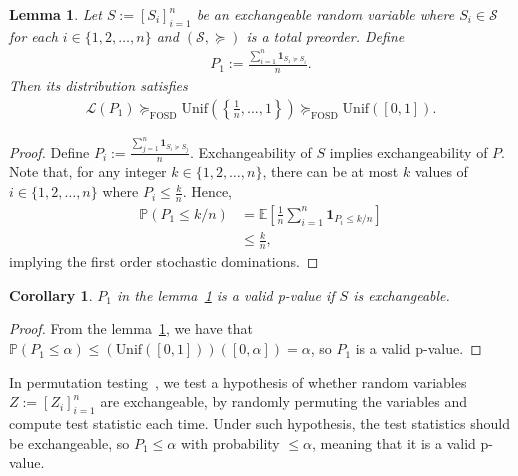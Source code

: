 \documentclass{article}
\newcommand{\expect}[1]{\mathbb{E}\left[ #1 \right]}
\newcommand{\prob}[1]{\mathbb{P}\left( #1 \right)}
\newcommand{\oo}[1]{\left( #1 \right)}
\newcommand{\cc}[1]{\left[ #1 \right]}
\newtheorem{lemma}{Lemma}
\newtheorem{corollary}{Corollary}
\begin{document}
    \begin{lemma}
    \label{lemma:exchangepvalue}
        Let $S:=\cc{S_i}_{i=1}^n$ be an exchangeable random variable where $S_i \in \mathcal{S}$ for each $i \in \{1,2,\dots, n\}$ and $\oo{\mathcal{S}, \succcurlyeq}$ is a total preorder. Define
        \begin{align*}
            P_1 := \frac{\sum_{i=1}^n \mathbf{1}_{S_1 \succcurlyeq S_i}}{n}.
        \end{align*}
        Then its distribution satisfies
        \begin{align*}
            \mathcal{L}(P_1)
            \succcurlyeq_{\mathrm{FOSD}}
            \mathrm{Unif}\!\left(\left\{\frac{1}{n},\ldots,1\right\}\right)
            \succcurlyeq_{\mathrm{FOSD}}
            \mathrm{Unif}([0,1]).
        \end{align*}
    \end{lemma}
    \begin{proof}
        Define $P_i:= \frac{\sum_{j=1}^n \mathbf{1}_{S_i \succcurlyeq S_j}}{n}$. Exchangeability of $S$ implies exchangeability of $P$. Note that, for any integer $k \in \{1,2,\dots, n\}$, there can be at most $k$ values of $i \in \{1,2,\dots, n\}$ where $P_i \le \frac{k}{n}$. Hence,
        \begin{align*}
            \prob{P_1 \le k/n}
            &= \expect{\frac{1}{n}
            \sum_{i=1}^n \mathbf{1}_{P_i \le k/n}} \\
            &\le \frac{k}{n},
        \end{align*}
        implying the first order stochastic dominations.
    \end{proof}
    \begin{corollary}
    \label{corollary:validpexchange}
        $P_1$ in the lemma~\ref{lemma:exchangepvalue} is a valid p-value if $S$ is exchangeable.
    \end{corollary}
    \begin{proof}
        From the lemma~\ref{lemma:exchangepvalue}, we have that $\mathbb{P}\left(P_1 \le \alpha\right) \le \left(\text{Unif}([0,1])\right)([0, \alpha]) = \alpha$, so $P_1$ is a valid p-value.
    \end{proof}

    In permutation testing~\citep{lehmann2005testing}, we test a hypothesis of whether random variables $Z := \cc{Z_i}_{i=1}^n$ are exchangeable, by randomly permuting the variables and compute test statistic each time. Under such hypothesis, the test statistics should be exchangeable, so $P_1 \le \alpha$ with probability $\le \alpha$, meaning that it is a valid p-value.  
\end{document}
